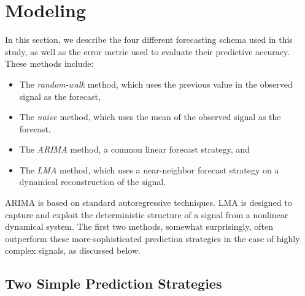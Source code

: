 \section{Modeling }\label{sec:model}
% 
% 
% 
% 

In this section, we describe the four different forecasting schema
used in this study, as well as the error metric used to evaluate their
predictive accuracy.  These methods include:
\begin{itemize}
\item The \emph{random-walk} method, which uses the previous value in
  the observed signal as the forecast,

\item The \emph{naive} method, which uses the mean of the
  observed signal as the forecast,

\item The \emph{ARIMA} method, a common linear forecast strategy, and

\item The \emph{LMA} method, which uses a near-neighbor forecast
  strategy on a dynamical reconstruction of the signal.
\end{itemize}
ARIMA is based on standard autoregressive techniques.  LMA is designed
to capture and exploit the deterministic structure of a signal from a
nonlinear dynamical system.  The first two methods, somewhat
surprisingly, often outperform these more-sophisticated prediction
strategies in the case of highly complex signals, as discussed below.

\subsection{Two Simple Prediction Strategies}
\label{sec:simple}

